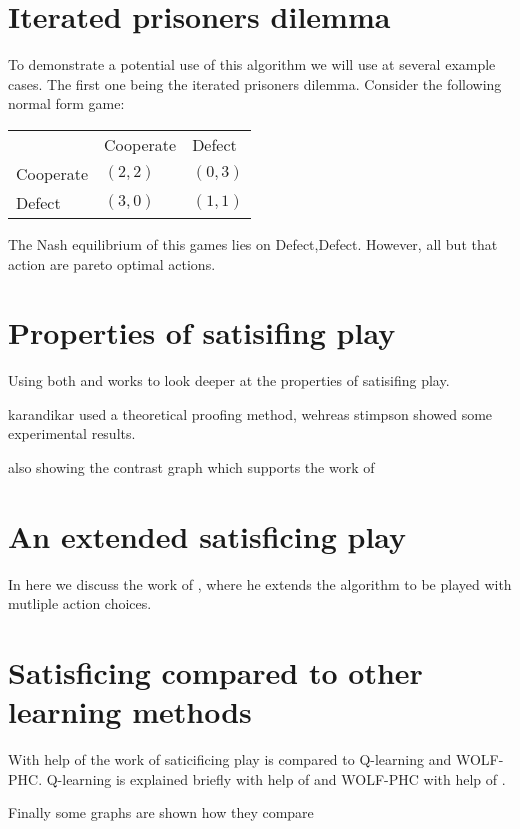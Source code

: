 \section{Iterated prisoners dilemma}

To demonstrate a potential use of this algorithm we will use at several example
cases. The first one being the iterated prisoners dilemma. Consider
the following normal form game:

\begin{tabular}{lll}
            & Cooperate   & Defect \\
  Cooperate & $(2,2)$     & $(0,3)$  \\
  Defect    & $(3,0)$     & $(1,1)$  \\
\end{tabular}

The Nash equilibrium of this games lies on Defect,Defect. However, all but
that action are pareto optimal actions.


\section{Properties of satisifing play}
Using both \citep{karandikar} and \citep{stimpson:2001} works to look deeper
at the properties of satisifing play. 

karandikar used a theoretical proofing method, wehreas stimpson showed some
experimental results.

also showing the contrast graph which supports the work of \citep{arthur}

\section{An extended satisficing play}

In here we discuss the work of \citep{stimpson:2003}, where he extends the
algorithm to be played with mutliple action choices.

\section{Satisficing compared to other learning methods}
With help of the work of \citep{crandall} saticificing play is compared
to Q-learning and WOLF-PHC.
Q-learning is explained briefly with help of \citep{sandholm} and WOLF-PHC
with help of \citep{bowling}.
 
Finally some graphs are shown how they compare



\address{Jappie Klooster\\
  Dept. of Informatics\\
  Universiteit Utrecht\\
  The Netherlands\\}
